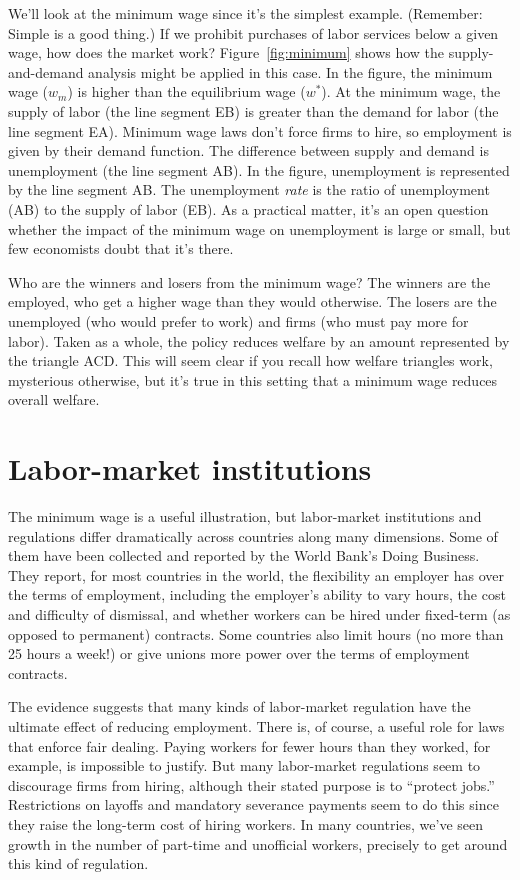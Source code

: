 We'll look at the minimum wage since it's the simplest example.
(Remember:  Simple is a good thing.)
If we prohibit purchases of labor services below a given wage,
how does the market work?
Figure~\ref{fig:minimum} shows how the supply-and-demand analysis
might be applied in this case.  In the figure, the minimum wage
($w_{m}$) is higher than the equilibrium wage ($w^{*}$).
At the minimum wage, the supply of labor
(the line segment EB) is greater than the demand for labor
(the line segment EA).
Minimum wage laws don't force firms to hire,
so employment is given by their demand function.
The difference between supply and demand is
unemployment (the line segment AB).
In the figure, unemployment is represented by the line segment AB.
The unemployment {\it rate\/} is the ratio of unemployment (AB)
to the supply of labor (EB).
As a practical matter, it's an open question whether the impact of the
minimum wage on unemployment is large or small, but few economists
doubt that it's there.


Who are the winners and losers from the minimum wage?
The winners are the employed,
who get a higher wage than they would otherwise.
The losers are the unemployed (who would prefer to work)
and firms (who must pay more for labor).
Taken as a whole, the policy reduces welfare by an amount
represented by the triangle ACD.
This will seem clear if you recall how welfare triangles work,
mysterious otherwise,
but it's true in this setting that a minimum wage reduces overall welfare.


\section{Labor-market institutions}

The minimum wage is a useful illustration,
but labor-market institutions 
 and regulations
differ dramatically across countries along many dimensions.
Some of them have been collected and reported by the
World Bank's Doing Business.
They report, for most countries in the world,
the flexibility an employer has over the terms of employment,
including the employer's ability to vary hours,
the cost and difficulty of dismissal,
and whether workers can be hired under fixed-term (as opposed to permanent)
contracts.
Some countries also limit hours (no more than 25 hours a week!)
or give unions more power over the terms of employment contracts.


The evidence suggests that many kinds of labor-market regulation
have the ultimate effect of reducing employment.
There is, of course, a useful role for laws that enforce fair dealing.
Paying workers for fewer hours than they worked,
for example, is impossible to justify.
But many labor-market regulations seem to discourage firms from hiring,
although their stated purpose is to ``protect jobs.''
Restrictions on layoffs and mandatory severance payments
seem to do this since they raise the long-term cost
of hiring workers.
In many countries, we've seen growth in the number of part-time and unofficial
workers, precisely to get around this kind of regulation.


